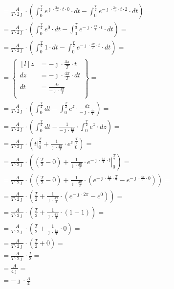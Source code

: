 \begin{task}
\begin{align*}
&=\frac{A}{T\cdot 2\jmath} \cdot \left( \int_{0}^{\frac{T}{2}}
e^{\jmath \cdot \frac{2\pi}{T} \cdot t \cdot 0} \cdot dt - \int_{0}^{\frac{T}{2}} e^{-\jmath \cdot \frac{2\pi}{T} \cdot t \cdot 2} \cdot dt \right)=\\
&=\frac{A}{T\cdot 2\jmath} \cdot \left( \int_{0}^{\frac{T}{2}}
e^{0} \cdot dt - \int_{0}^{\frac{T}{2}} e^{-\jmath \cdot \frac{4\pi}{T} \cdot t} \cdot dt \right)=\\
&=\frac{A}{T\cdot 2\jmath} \cdot \left( \int_{0}^{\frac{T}{2}}
1 \cdot dt - \int_{0}^{\frac{T}{2}} e^{-\jmath \cdot \frac{4\pi}{T} \cdot t} \cdot dt \right)=\\
&=\begin{Bmatrix*}[l]
z&=-\jmath \cdot \frac{4\pi}{T} \cdot t\\
dz&=-\jmath \cdot \frac{4\pi}{T} \cdot dt\\
dt&=\frac{dz}{-\jmath \cdot \frac{4\pi}{T} }\\
\end{Bmatrix*}=\\
&=\frac{A}{T\cdot 2\jmath} \cdot \left( \int_{0}^{\frac{T}{2}}
dt - \int_{0}^{\frac{T}{2}} e^{z} \cdot \frac{dz}{-\jmath \cdot \frac{4\pi}{T}} \right)=\\
&=\frac{A}{T\cdot 2\jmath} \cdot \left( \int_{0}^{\frac{T}{2}}
dt - \frac{1}{-\jmath \cdot \frac{4\pi}{T}} \cdot \int_{0}^{\frac{T}{2}} e^{z} \cdot dz \right)=\\
&=\frac{A}{T\cdot 2\jmath} \cdot \left(\left. t \right|_{0}^{\frac{T}{2}} + \frac{1}{\jmath \cdot \frac{4\pi}{T}} \cdot \left. e^{z} \right|_{0}^{\frac{T}{2}} \right)=\\
&=\frac{A}{T\cdot 2\jmath} \cdot \left(\left( \frac{T}{2}- 0 \right) + \frac{1}{\jmath \cdot \frac{4\pi}{T}} \cdot \left. e^{-\jmath \cdot \frac{4\pi}{T} \cdot t} \right|_{0}^{\frac{T}{2}} \right)=\\
&=\frac{A}{T\cdot 2\jmath} \cdot \left(\left( \frac{T}{2}- 0 \right) + \frac{1}{\jmath \cdot \frac{4\pi}{T}} \cdot \left( e^{-\jmath \cdot \frac{4\pi}{T} \cdot \frac{T}{2}} - e^{-\jmath \cdot \frac{4\pi}{T} \cdot 0}\right)\right)=\\
&=\frac{A}{T\cdot 2\jmath} \cdot \left( \frac{T}{2} + \frac{1}{\jmath \cdot \frac{4\pi}{T}} \cdot \left( e^{-\jmath \cdot 2\pi} - e^{0}\right)\right)=\\
&=\frac{A}{T\cdot 2\jmath} \cdot \left( \frac{T}{2} + \frac{1}{\jmath \cdot \frac{4\pi}{T}} \cdot \left( 1 - 1\right)\right)=\\
&=\frac{A}{T\cdot 2\jmath} \cdot \left( \frac{T}{2} + \frac{1}{\jmath \cdot \frac{4\pi}{T}} \cdot 0\right)=\\
&=\frac{A}{T\cdot 2\jmath} \cdot \left( \frac{T}{2} + 0\right)=\\
&=\frac{A}{T\cdot 2\jmath} \cdot \frac{T}{2} =\\
&=\frac{A}{4 \jmath} =\\
&=-\jmath \cdot \frac{A}{4}
\end{align*}


\end{task}
